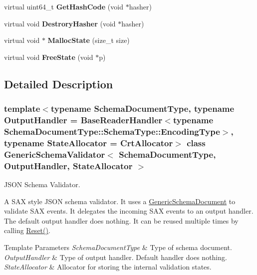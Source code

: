 \begin{DoxyCompactItemize}
\item 
\mbox{\label{a02244_ac01c45982a1f512e1ca06fe5544b0c0f}} 
virtual uint64\+\_\+t {\bfseries Get\+Hash\+Code} (void $\ast$hasher)
\item 
\mbox{\label{a02244_a007eef58be575dc562543d069ddd2710}} 
virtual void {\bfseries Destrory\+Hasher} (void $\ast$hasher)
\item 
\mbox{\label{a02244_a7c999dfb3118aaa08495d60eee6d3732}} 
virtual void $\ast$ {\bfseries Malloc\+State} (size\+\_\+t size)
\item 
\mbox{\label{a02244_a4e250737a411af2969a9e585a7da4187}} 
virtual void {\bfseries Free\+State} (void $\ast$p)
\end{DoxyCompactItemize}


\subsection{Detailed Description}
\subsubsection*{template$<$typename Schema\+Document\+Type, typename Output\+Handler = Base\+Reader\+Handler$<$typename Schema\+Document\+Type\+::\+Schema\+Type\+::\+Encoding\+Type$>$, typename State\+Allocator = Crt\+Allocator$>$\newline
class Generic\+Schema\+Validator$<$ Schema\+Document\+Type, Output\+Handler, State\+Allocator $>$}

J\+S\+ON Schema Validator. 

A S\+AX style J\+S\+ON schema validator. It uses a {\ttfamily \hyperlink{a02240}{Generic\+Schema\+Document}} to validate S\+AX events. It delegates the incoming S\+AX events to an output handler. The default output handler does nothing. It can be reused multiple times by calling {\ttfamily \hyperlink{a02244_a49efbbe098cb77728be3d48cafed17e4}{Reset()}}.


\begin{DoxyTemplParams}{Template Parameters}
{\em Schema\+Document\+Type} & Type of schema document. \\
\hline
{\em Output\+Handler} & Type of output handler. Default handler does nothing. \\
\hline
{\em State\+Allocator} & Allocator for storing the internal validation states. \\
\hline
\end{DoxyTemplParams}


